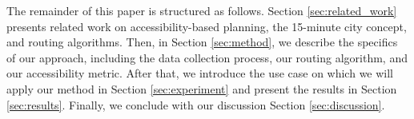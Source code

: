 The remainder of this paper is structured as follows.
Section \ref{sec:related_work} presents related work on accessibility-based planning, the 15-minute city concept, and routing algorithms.
Then, in Section \ref{sec:method}, we describe the specifics of our approach, including the data collection process, our routing algorithm, and our accessibility metric.
After that, we introduce the use case on which we will apply our method in Section \ref{sec:experiment} and present the results in Section \ref{sec:results}.
Finally, we conclude with our discussion Section \ref{sec:discussion}.


